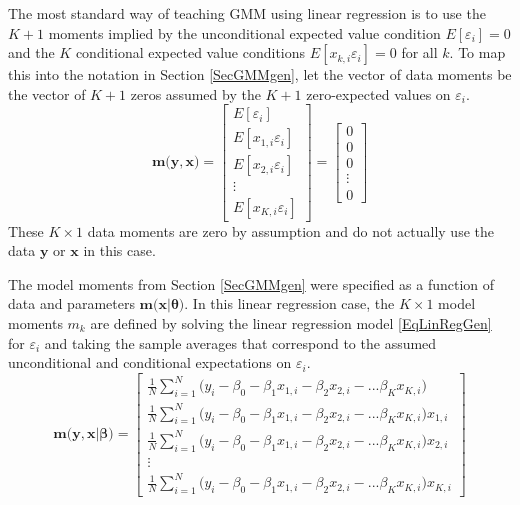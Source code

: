 \documentclass[letterpaper,12pt]{article}
\theoremstyle{definition}
\newcommand\ve{\varepsilon}
\begin{document}
    The most standard way of teaching GMM using linear regression is to use the $K+1$ moments implied by the unconditional expected value condition $E[\ve_i]=0$ and the $K$ conditional expected value conditions $E[x_{k,i}\ve_i]=0$ for all $k$. To map this into the notation in Section \ref{SecGMMgen}, let the vector of data moments be the vector of $K+1$ zeros assumed by the $K+1$ zero-expected values on $\ve_i$.
    \begin{equation}\label{EqLinRegDataMoms1}
      \bm{m}\bigl(\bm{y},\bm{x}\bigr) =
        \begin{bmatrix}
          E[\ve_i] \\ E[x_{1,i}\ve_i] \\ E[x_{2,i}\ve_i] \\ \vdots \\ E[x_{K,i}\ve_i]
        \end{bmatrix} =
        \begin{bmatrix} 0 \\ 0 \\ 0 \\ \vdots \\ 0
        \end{bmatrix}
    \end{equation}
    These $K\times 1$ data moments are zero by assumption and do not actually use the data $\bm{y}$ or $\bm{x}$ in this case.

    The model moments from Section \ref{SecGMMgen} were specified as a function of data and parameters $\bm{m}\bigl(\bm{x}|\bm{\theta}\bigr)$. In this linear regression case, the $K\times 1$ model moments $m_k$ are defined by solving the linear regression model \eqref{EqLinRegGen} for $\ve_i$ and taking the sample averages that correspond to the assumed unconditional and conditional expectations on $\ve_i$.
    \begin{equation}\label{EqLinRegModelMoms1}
      \bm{m}\bigl(\bm{y},\bm{x}|\bm{\beta}\bigr) =
        \begin{bmatrix}
          \frac{1}{N}\sum_{i=1}^N\bigl(y_i - \beta_0 - \beta_1 x_{1,i} - \beta_2 x_{2,i} - ... \beta_K x_{K,i}\bigr) \\ \frac{1}{N}\sum_{i=1}^N\bigl(y_i - \beta_0 - \beta_1 x_{1,i} - \beta_2 x_{2,i} - ... \beta_K x_{K,i}\bigr)x_{1,i} \\ \frac{1}{N}\sum_{i=1}^N\bigl(y_i - \beta_0 - \beta_1 x_{1,i} - \beta_2 x_{2,i} - ... \beta_K x_{K,i}\bigr)x_{2,i} \\ \vdots \\ \frac{1}{N}\sum_{i=1}^N\bigl(y_i - \beta_0 - \beta_1 x_{1,i} - \beta_2 x_{2,i} - ... \beta_K x_{K,i}\bigr)x_{K,i}
        \end{bmatrix}
    \end{equation}
\end{document}
